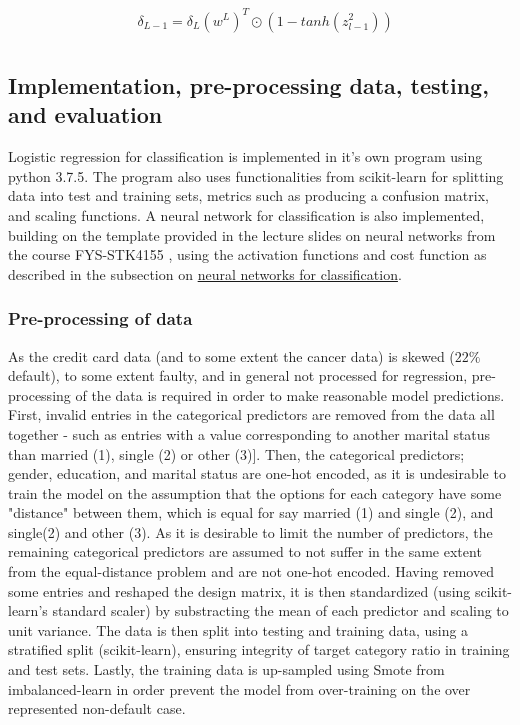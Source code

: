 \documentclass[%
oneside,                 %
final,                   %
10pt]{article}
\begin{document}
\begin{align*}
&\delta_{L-1}=\delta_L(w^{L})^T    \odot (1-tanh(z_{l-1}^2)) \\ 
\end{align*}

\subsection{Implementation, pre-processing data, testing, and evaluation}
Logistic regression for classification is implemented in it's own program using python 3.7.5. The program also uses functionalities from scikit-learn \cite{sklearn} for splitting data into test and training sets, metrics such as producing a confusion matrix, and scaling functions. A neural network for classification is also implemented, building on the template provided in the lecture slides on neural networks from the course FYS-STK4155 \cite{MHJ_NN}, using the activation functions and cost function as described in the subsection on \hyperref[Section_M_NNclass]{neural networks for classification}. 

\subsubsection{Pre-processing of data}  \label{Section_M_PP}
As the credit card data (and to some extent the cancer data) is skewed ($22\%$ default), to some extent faulty, and in general not processed for regression, pre-processing of the data is required in order to make reasonable model predictions. First, invalid entries  in the categorical predictors are removed from the data all together - such as entries with a value corresponding to another marital status than married (1), single (2) or other (3)]. Then, the categorical predictors; gender, education, and  marital status are one-hot encoded, as it is undesirable to train the model on the assumption that the options for each category have some "distance" between them, which is equal for say  married (1) and single (2), and single(2) and other (3). As it is desirable to limit the number of predictors, the remaining categorical predictors are assumed to not suffer in the same extent from the equal-distance problem and are not one-hot encoded. Having removed some entries and reshaped the design matrix,  it is then standardized (using scikit-learn's standard scaler) by substracting the mean of each predictor and scaling to unit variance. The data is then split into testing and training data, using a stratified split (scikit-learn), ensuring integrity of target category ratio in training and test sets. Lastly, the training data is up-sampled using Smote from imbalanced-learn \cite{imblearn} in order  prevent the model from over-training on the over represented non-default case.
\end{document}
